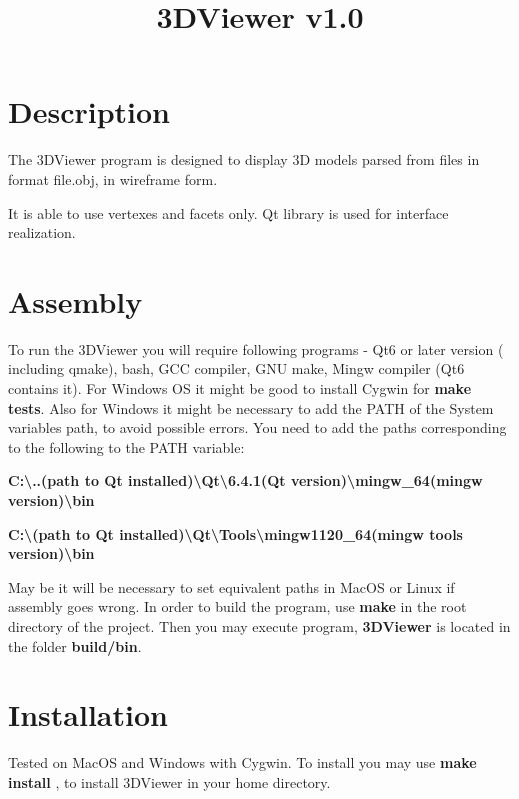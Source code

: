 \documentclass[12pt, a4paper]{article}
\title{3DViewer v1.0}
\date{}
\begin{document}
\maketitle
\tableofcontents

\pagebreak

\section*{Description}

The 3DViewer program is designed to display 3D models parsed from files in format file.obj, in wireframe form.

It is able to use vertexes and facets only. Qt library is used for interface realization.

\section{Assembly}

To run the 3DViewer you will require following programs - Qt6 or later version ( including qmake), bash, GCC compiler,
GNU make, Mingw compiler (Qt6 contains it). For Windows OS it might be good to install Cygwin for \textbf{make tests}. Also for Windows it
might be necessary to add the PATH  of the System variables path, to avoid  possible errors. You need to add the paths
corresponding to the following to the PATH variable:

\noindent\textbf{C:\textbackslash{}..(path to Qt installed)\textbackslash{}Qt\textbackslash{}6.4.1(Qt version)\textbackslash{}mingw\_64(mingw version)\textbackslash{}bin}

\noindent\textbf{C:\textbackslash{}(path to Qt installed)\textbackslash{}Qt\textbackslash{}Tools\textbackslash{}mingw1120\_64(mingw tools version)\textbackslash{}bin}

May be it will be necessary to set equivalent paths in MacOS or Linux if assembly goes wrong.
 In order to build the program, use \textbf{make} in the root directory of the project.  Then you may execute program,
\textbf{3DViewer} is located in the folder \textbf{build/bin}.

\section{Installation }

Tested on MacOS  and Windows with Cygwin.
To install you may use \textbf{make install} , to install 3DViewer in your home directory.
\end{document}
